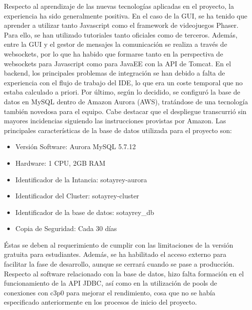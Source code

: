 Respecto al aprendizaje de las nuevas tecnologías aplicadas en el proyecto, la experiencia ha sido generalmente positiva. En el caso de la GUI, se ha tenido que aprender a utilizar tanto Javascript como el framework de videojuegos Phaser. Para ello, se han utilizado tutoriales tanto oficiales como de terceros. Además, entre la GUI y el gestor de mensajes la comunicación se realiza a través de websockets, por lo que ha habido que formarse tanto en la perspectiva de websockets para Javascript como para JavaEE con la API de Tomcat. En el backend, los principales problemas de integración se han debido a falta de experiencia con el flujo de trabajo del IDE, lo que era un coste temporal que no estaba calculado a priori. Por último, según lo decidido, se configuró la base de datos en MySQL dentro de Amazon Aurora (AWS), tratándose de una tecnología también novedosa para el equipo. Cabe destacar que el despliegue transcurrió sin mayores incidencias siguiendo las instrucciones provistas por Amazon. Las principales características de la base de datos utilizada para el proyecto son:

\begin{itemize}
	\item Versión Software: Aurora MySQL 5.7.12
	\item Hardware: 1 CPU, 2GB RAM
	\item Identificador de la Intancia: sotayrey-aurora
	\item Identificador del Cluster: sotayrey-cluster
	\item Identificador de la base de datos: sotayrey\_db
	\item Copia de Seguridad: Cada 30 días
\end{itemize}

Éstas se deben al requerimiento de cumplir con las limitaciones de la versión gratuita para estudiantes. Además, se ha habilitado el acceso externo para facilitar la fase de desarrollo, aunque se cerrará cuando se pase a producción. Respecto al software relacionado con la base de datos, hizo falta formación en el funcionamiento de la API JDBC, así como en la utilización de pools de conexiones con c3p0 para mejorar el rendimiento, cosa que no se había especificado anteriormente en los procesos de inicio del proyecto.

